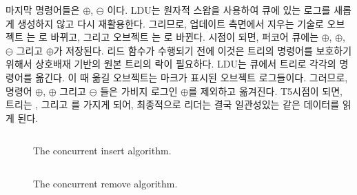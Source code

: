 마지막 명령어들은 $\oplus$, $\ominus$ 이다. 
LDU는 원자적 스왑을 사용하여 큐에 있는 로그를 새롭게 생성하지 않고 다시 재활용한다. 
그리므로, 업데이트 측면에서 지우는 기술로
 오브젝트 는 로 바뀌고, 그리고 오브젝트 는
로 바뀐다. 
 시점이 되면, 퍼코어 큐에는 $\oplus$, $\oplus$, $\ominus$ 
그리고 $\oplus$가 저장된다. 
리드 함수가 수행되기 전에 이것은 트리의 명령어를 보호하기 위해서
상호배재 기반의 원본 트리의 락이 필요하다. 
LDU는 큐에서 트리로 각각의 명령어를 옮긴다. 이 때 옮길 오브젝트는 마크가 표시된 
오브젝트 로그들이다.
그러므로, 명령어 $\oplus$, $\oplus$ 그리고 $\ominus$
들은 가비지 로그인 $\oplus$를 제외하고 옮겨진다. 
T5시점이 되면, 트리는 ,  그리고 를 가지게 되어, 
최종적으로 리더는 결국 일관성있는 같은 데이터를 읽게 된다. 

\begin{figure}[h]
\begin{center}
\inputminted[linenos,fontsize=\footnotesize, tabsize=4]{c}{src/ldu_logical_a.c}
\end{center}
\caption{The \LDU concurrent insert algorithm. }
\label{fig:gldulogicalupdate}
\end{figure}


\begin{figure}[h]
\begin{center}
\inputminted[linenos,fontsize=\footnotesize, tabsize=4]{c}{src/ldu_logical_b.c}
\end{center}
\caption{The \LDU concurrent remove algorithm.}
\label{fig:gldulogicalupdate}
\end{figure}


